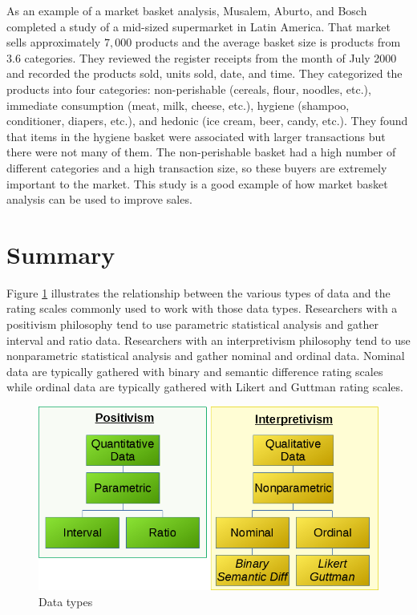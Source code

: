 As an example of a market basket analysis, Musalem, Aburto, and Bosch completed a study of a mid-sized supermarket in Latin America\cite{musalem2018market}. That market sells approximately $ 7,000 $ products and the average basket size is products from $ 3.6 $ categories. They reviewed the register receipts from the month of July 2000 and recorded the products sold, units sold, date, and time. They categorized the products into four categories: non-perishable (cereals, flour, noodles, etc.), immediate consumption (meat, milk, cheese, etc.), hygiene (shampoo, conditioner, diapers, etc.), and hedonic (ice cream, beer, candy, etc.). They found that items in the hygiene basket were associated with larger transactions but there were not many of them. The non-perishable basket had a high number of different categories and a high transaction size, so these buyers are extremely important to the market. This study is a good example of how market basket analysis can be used to improve sales.

\section{Summary}\label{ch06:summary}

Figure \ref{fig06.04} illustrates the relationship between the various types of data and the rating scales commonly used to work with those data types. Researchers with a positivism philosophy tend to use parametric statistical analysis and gather interval and ratio data. Researchers with an interpretivism philosophy tend to use nonparametric statistical analysis and gather nominal and ordinal data. Nominal data are typically gathered with binary and semantic difference rating scales while ordinal data are typically gathered with Likert and Guttman rating scales.

\begin{figure}[H]
	\centering
	\includegraphics[width=\maxwidth{.95\linewidth}]{gfx/06-DataTypes}
	\caption{Data types}
	\label{fig06.04}
\end{figure}
